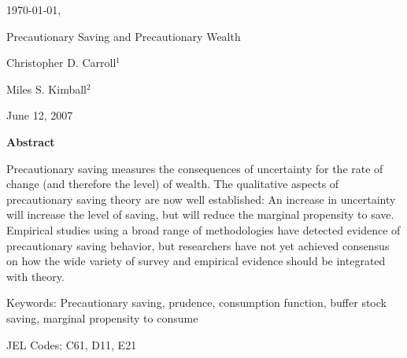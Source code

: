 \documentclass[12pt,letterpaper]{econtex}
\begin{document}





\begin{titlepage}

  \enlargethispage{3000pt}

  \hfill{\tiny \today, \jobname}



  \vspace{0.2in}

  \centerline{\LARGE Precautionary Saving and Precautionary Wealth}

  \vspace{.2in}

  \normalsize

  \centerline{\Large Christopher D. Carroll$^1$}
  \medskip\medskip
  \centerline{\Large Miles S. Kimball$^2$}
  \medskip
  \medskip


  \centerline{June 12, 2007}

  \vspace{.2in}

  \centerline{\bf Abstract}
  \normalsize

  Precautionary saving measures the consequences of uncertainty for the
  rate of change (and therefore the level) of wealth.  The qualitative
  aspects of precautionary saving theory are now well established: An
  increase in uncertainty will increase the level of saving, but will
  reduce the marginal propensity to save.  Empirical studies using a
  broad range of methodologies have detected evidence of precautionary
  saving behavior, but researchers have not yet achieved consensus on
  how the wide variety of survey and empirical evidence should be
  integrated with theory.

  \vspace{0.2in}

  \noindent Keywords: Precautionary saving, prudence, consumption function, buffer stock saving, 
  marginal propensity to consume
  \medskip\medskip

  \noindent JEL Codes: C61, D11, E21

  \medskip




\end{titlepage}
\end{document}
